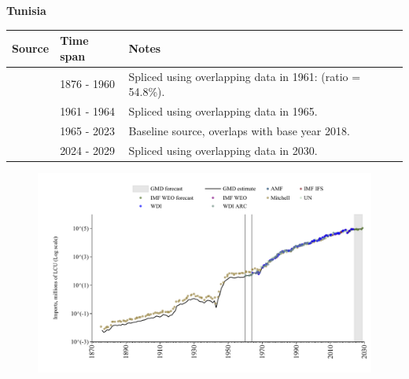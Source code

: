 \documentclass[12pt,a4paper,landscape]{article}
\begin{document}
\begin{adjustbox}{max totalsize={\paperwidth}{\paperheight},center}
\begin{minipage}[t][\textheight][t]{\textwidth}
\vspace*{0.5cm}
{}
\begin{center}
{\Large\bfseries Tunisia}
\end{center}
\vspace{0.5cm}
\begin{table}[H]
\centering
\small
\begin{tabular}{|l|l|l|}
\hline
\textbf{Source} & \textbf{Time span} & \textbf{Notes} \\
\hline
\rowcolor{white}\cite{Mitchell}& 1876 - 1960 &Spliced using overlapping data in 1961: (ratio = 54.8\%).\\
\rowcolor{lightgray}\cite{WDI_ARC}& 1961 - 1964 &Spliced using overlapping data in 1965.\\
\rowcolor{white}\cite{WDI}& 1965 - 2023 &Baseline source, overlaps with base year 2018.\\
\rowcolor{lightgray}\cite{IMF_WEO_forecast}& 2024 - 2029 &Spliced using overlapping data in 2030.\\
\hline
\end{tabular}
\end{table}
\begin{figure}[H]
\centering
\includegraphics[width=\textwidth,height=0.6\textheight,keepaspectratio]{graphs/TUN_imports.pdf}
\end{figure}
\end{minipage}
\end{adjustbox}
\end{document}
